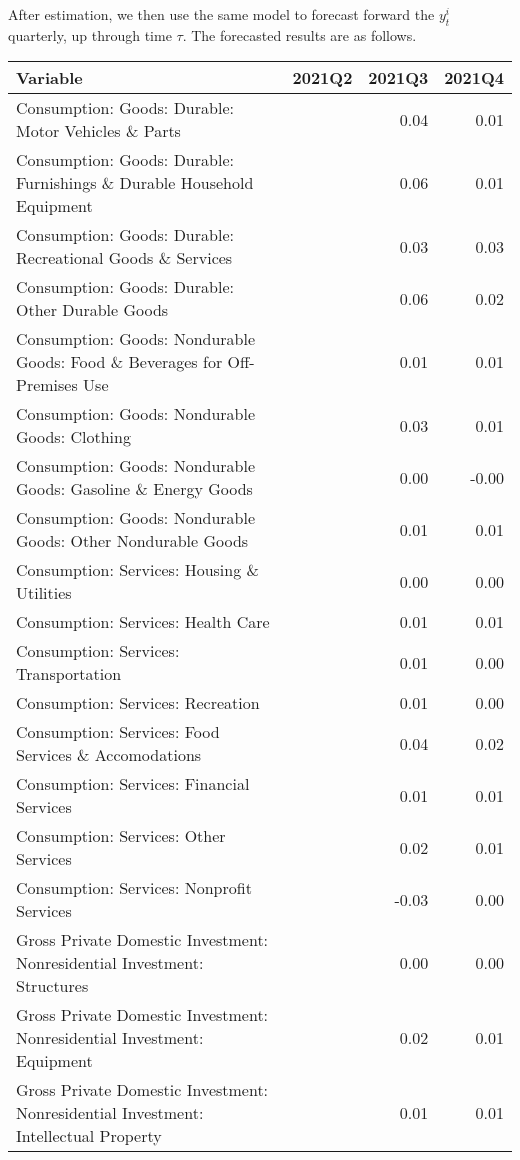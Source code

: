 \documentclass[11pt, letterpaper]{article}\usepackage[]{graphicx}\usepackage[]{color}
\begin{document}
After estimation, we then use the same model to forecast forward the $y^i_t$ quarterly, up through time $\tau$. 
The forecasted results are as follows.
\begin{table}[H]
\centering
\begingroup\scriptsize
\begin{tabular}{lrrr}
  \hline
Variable & 2021Q2 & 2021Q3 & 2021Q4 \\ 
  \hline
Consumption: Goods: Durable: Motor Vehicles \& Parts &  & 0.04 & 0.01 \\ 
  Consumption: Goods: Durable: Furnishings \& Durable Household Equipment &  & 0.06 & 0.01 \\ 
  Consumption: Goods: Durable: Recreational Goods \& Services &  & 0.03 & 0.03 \\ 
  Consumption: Goods: Durable: Other Durable Goods &  & 0.06 & 0.02 \\ 
  Consumption: Goods: Nondurable Goods: Food \& Beverages for Off-Premises Use &  & 0.01 & 0.01 \\ 
  Consumption: Goods: Nondurable Goods: Clothing &  & 0.03 & 0.01 \\ 
  Consumption: Goods: Nondurable Goods: Gasoline \& Energy Goods &  & 0.00 & -0.00 \\ 
  Consumption: Goods: Nondurable Goods: Other Nondurable Goods &  & 0.01 & 0.01 \\ 
  Consumption: Services: Housing \& Utilities &  & 0.00 & 0.00 \\ 
  Consumption: Services: Health Care &  & 0.01 & 0.01 \\ 
  Consumption: Services: Transportation &  & 0.01 & 0.00 \\ 
  Consumption: Services: Recreation &  & 0.01 & 0.00 \\ 
  Consumption: Services: Food Services \& Accomodations &  & 0.04 & 0.02 \\ 
  Consumption: Services: Financial Services &  & 0.01 & 0.01 \\ 
  Consumption: Services: Other Services &  & 0.02 & 0.01 \\ 
  Consumption: Services: Nonprofit Services &  & -0.03 & 0.00 \\ 
  Gross Private Domestic Investment: Nonresidential Investment: Structures &  & 0.00 & 0.00 \\ 
  Gross Private Domestic Investment: Nonresidential Investment: Equipment &  & 0.02 & 0.01 \\ 
  Gross Private Domestic Investment: Nonresidential Investment: Intellectual Property &  & 0.01 & 0.01 \\ 

\end{tabular}
\end{table}
\end{document}
